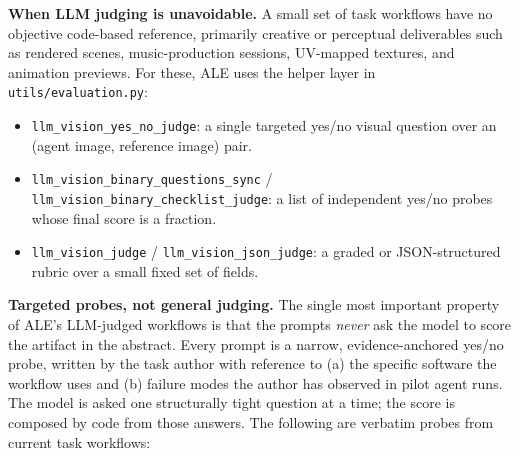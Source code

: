 \noindent \textbf{When LLM judging is unavoidable.}
A small set of task workflows have no objective code-based reference, primarily creative or perceptual deliverables such as rendered scenes, music-production sessions, UV-mapped textures, and animation previews. For these, ALE uses the helper layer in \texttt{utils/evaluation.py}:
\begin{itemize}[nosep,leftmargin=1.2em]
    \item \texttt{llm\_vision\_yes\_no\_judge}: a single targeted yes/no visual question over an (agent image, reference image) pair.
    \item \texttt{llm\_vision\_binary\_questions\_sync} / \texttt{llm\_vision\_binary\_checklist\_judge}: a list of independent yes/no probes whose final score is a fraction.
    \item \texttt{llm\_vision\_judge} / \texttt{llm\_vision\_json\_judge}: a graded or JSON-structured rubric over a small fixed set of fields.
\end{itemize}

\noindent \textbf{Targeted probes, not general judging.}
The single most important property of ALE's LLM-judged workflows is that the prompts \emph{never} ask the model to score the artifact in the abstract. Every prompt is a narrow, evidence-anchored yes/no probe, written by the task author with reference to (a) the specific software the workflow uses and (b) failure modes the author has observed in pilot agent runs. The model is asked one structurally tight question at a time; the score is composed by code from those answers. The following are verbatim probes from current task workflows:

